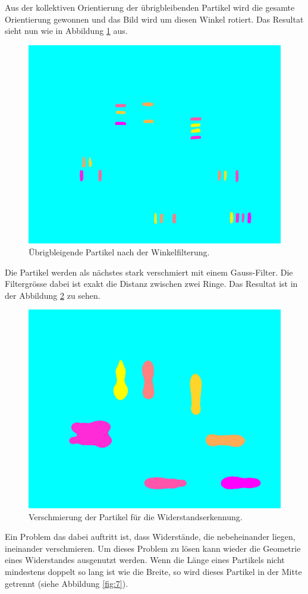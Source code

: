 Aus der  kollektiven  Orientierung  der  \"ubrigbleibenden  Partikel  wird die
gesamte  Orientierung gewonnen und das Bild wird um diesen Winkel rotiert. Das
Resultat sieht nun wie in Abbildung \ref{fig:5} aus.

\begin{figure}[H]
    \centering
    \includegraphics[width=.7\linewidth]{images/5}
    \caption{\"Ubrigbleigende Partikel nach der Winkelfilterung.}
    \label{fig:5}
\end{figure}

Die Partikel werden als n\"achstes stark verschmiert mit  einem  Gauss-Filter.
Die Filtergr\"osse  dabei  ist  exakt  die  Distanz  zwischen  zwei Ringe. Das
Resultat ist in der Abbildung \ref{fig:6} zu sehen.

\begin{figure}[H]
    \centering
    \includegraphics[width=.7\linewidth]{images/6}
    \caption{Verschmierung der Partikel f\"ur die Widerstandserkennung.}
    \label{fig:6}
\end{figure} 

Ein Problem das dabei auftritt  ist,  dass  Widerst\"ande,  die  nebeheinander
liegen, ineinander verschmieren. Um dieses Problem zu l\"osen kann  wieder die
Geometrie  eines  Widerstandes  ausgenutzt  werden.  Wenn  die  L\"ange  eines
Partikels nicht mindestens doppelt so lang ist wie  die Breite, so wird dieses
Partikel  in  der  Mitte  getrennt  (siehe  Abbildung  \ref{fig:7}).

